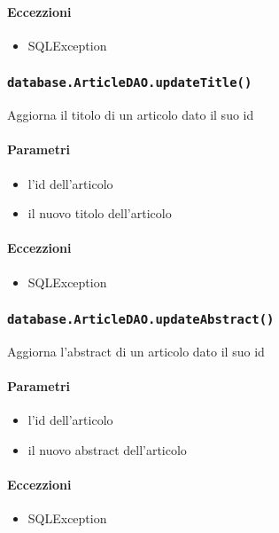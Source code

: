 \paragraph{Eccezzioni}
\begin{itemize}
  \item SQLException
\end{itemize}

\subsubsection{\texttt{database.ArticleDAO.updateTitle()}}
Aggiorna il titolo di un articolo dato il suo id
\paragraph{Parametri}
\begin{itemize}
\item l'id dell'articolo              
\item il nuovo titolo dell'articolo
\end{itemize}
\paragraph{Eccezzioni}
\begin{itemize}
  \item SQLException
\end{itemize}

\subsubsection{\texttt{database.ArticleDAO.updateAbstract()}}
Aggiorna l'abstract di un articolo dato il suo id
\paragraph{Parametri}
\begin{itemize}
\item l'id dell'articolo              
\item il nuovo abstract dell'articolo
\end{itemize}
\paragraph{Eccezzioni}
\begin{itemize}
  \item SQLException
\end{itemize}

